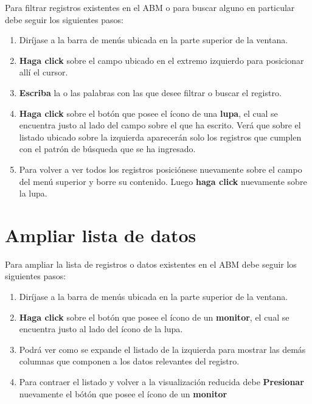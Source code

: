 \documentclass{book}
\begin{document}
Para filtrar registros existentes en el ABM o para buscar alguno en particular debe seguir los siguientes pasos:
\medskip

\begin{enumerate}
	\itemsep=8pt \topsep=0pt \partopsep=0pt \parskip=0pt \parsep=0pt
	
	\item Diríjase a la barra de menús ubicada en la parte superior de la ventana.

	\item \textbf{Haga click} sobre el campo ubicado en el extremo izquierdo para posicionar allí el cursor.

	\item \textbf{Escriba} la o las palabras con las que desee filtrar o buscar el registro.

	\item \textbf{Haga click} sobre el botón que posee el ícono de una \textbf{lupa}, el cual se encuentra justo al lado del campo sobre el que ha escrito. Verá que sobre el listado ubicado sobre la izquierda aparecerán solo los registros que cumplen con el patrón de búsqueda que se ha ingresado.

	\item Para volver a ver todos los registros posiciónese nuevamente sobre el campo del menú superior y borre su contenido. Luego \textbf{haga click} nuevamente sobre la lupa.

\end{enumerate}
\medskip


\section{Ampliar lista de datos}

Para ampliar la lista de registros o datos existentes en el ABM debe seguir los siguientes pasos:
\medskip

\begin{enumerate}
	\itemsep=8pt \topsep=0pt \partopsep=0pt \parskip=0pt \parsep=0pt
	
	\item Diríjase a la barra de menús ubicada en la parte superior de la ventana.

	\item \textbf{Haga click} sobre el botón que posee el ícono de un \textbf{monitor}, el cual se encuentra justo al lado del ícono de la lupa.

	\item Podrá ver como se expande el listado de la izquierda para mostrar las demás columnas que componen a los datos relevantes del registro.

	\item Para contraer el listado y volver a la visualización reducida debe \textbf{Presionar} nuevamente el bótón que posee el ícono de un \textbf{monitor}

\end{enumerate}
\medskip
\end{document}
